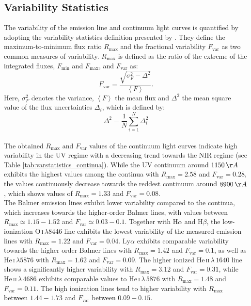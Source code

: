 \subsection{Variability Statistics}
The variability of the emission line and continuum light curves is quantified by adopting the variability statistics definition presented by \cite{rodriguez1997steps}. They define the maximum-to-minimum flux ratio $R_\mathrm{max}$ and the fractional variability	$F_\mathrm{var}$ as two common measures of variability. $R_\mathrm{max}$ is defined as the ratio of the extreme of the integrated fluxes, $F_\mathrm{min}$ and $F_\mathrm{max}$, and  $F_\mathrm{var}$ as: 
\begin{equation}
	F_\mathrm{var}=\frac{\sqrt{\sigma_F^2-\Delta^2}}{\left<F\right>}.
\end{equation}
Here, $\sigma_F^2$ denotes the variance, $\left<F\right>$ the mean flux and $\Delta^2$ the mean square value of the flux uncertainties $\Delta_i$, which is defined by:
\begin{equation}
	\Delta^2 = \frac{1}{N} \sum_{i=1}^{N}\Delta_i^2
\end{equation}\\
The obtained $R_\mathrm{max}$ and $F_\mathrm{var}$ values of the continuum light curves indicate high variability in the UV regime with a decreasing trend towards the NIR regime (see Table \ref{tab:varstatistics_continua}). While the UV continuum around $1150\,\AA$ exhibits the highest values among the continua with $R_\mathrm{max} = 2.58$ and $F_\mathrm{var} = 0.28$, the values continuously decrease towards the reddest continuum around $8900\,\AA$, which shows values of $R_\mathrm{max} = 1.33$ and $F_\mathrm{var} = 0.08$.\\
The Balmer emission lines exhibit lower variability compared to the continua, which increases towards the higher-order Balmer lines, with values between $R_\mathrm{max} \simeq 1.15-1.52$ and $F_\mathrm{var} \simeq 0.03-0.1$. Together with H$\alpha$ and H$\beta$, the low-ionization O\,\textsc{i}$\,\lambda 8446$ line exhibits the lowest variability of the measured emission lines with $R_\mathrm{max} = 1.22$ and $F_\mathrm{var} = 0.04$. Ly$\alpha$ exhibits comparable variability towards the higher order Balmer lines with $R_\mathrm{max} = 1.42$ and $F_\mathrm{var} = 0.1$, as well as He\,\textsc{i}$\,\lambda5876$ with $R_\mathrm{max} = 1.62$ and $F_\mathrm{var} = 0.09$. The higher ionized He\,\textsc{ii}$\,\lambda\,1640$ line shows a significantly higher variability with $R_\mathrm{max} = 3.12$ and $F_\mathrm{var} = 0.31$, while He\,\textsc{ii}$\,\lambda\,4686$ exhibits comparable values to He\,\textsc{i}$\,\lambda\,5876$ with $R_\mathrm{max} = 1.48$ and $F_\mathrm{var} = 0.11$. The high ionization lines tend to higher variability with $R_\mathrm{max}$ between $1.44-1.73$ and $F_\mathrm{var}$ between $0.09 - 0.15$.\\

